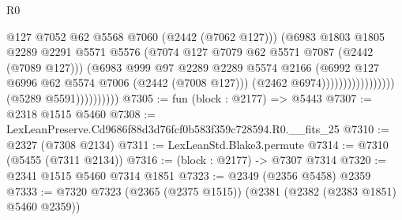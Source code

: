 \begin{lexlean}{R0}
\begin{coremodule}
                                                    @127
                                                    @7052
                                                    @62
                                                    @5568
                                                    @7060
                                                    (@2442 (@7062 @127)))
                                                  (@6983
                                                    @1803
                                                    @1805
                                                    @2289
                                                    @2291
                                                    @5571
                                                    @5576
                                                    (@7074
                                                      @127
                                                      @7079
                                                      @62
                                                      @5571
                                                      @7087
                                                      (@2442 (@7089 @127)))
                                                    (@6983
                                                      @999
                                                      @97
                                                      @2289
                                                      @2289
                                                      @5574
                                                      @2166
                                                      (@6992
                                                        @127
                                                        @6996
                                                        @62
                                                        @5574
                                                        @7006
                                                        (@2442 (@7008 @127)))
                                                      (@2462 @6974)))))))))))))))))
                      (@5289 @5591))))))))))
@7305 := fun (block : @2177) => @5443
@7307 := @2318 @1515 @5460
@7308 := LexLeanPreserve.Cd9686f88d3d76fcf0b583f359c728594.R0.__fits_25
@7310 := @2327 (@7308 @2134)
@7311 := LexLeanStd.Blake3.permute
@7314 := @7310 (@5455 (@7311 @2134))
@7316 := (block : @2177) -> @7307 @7314
@7320 := @2341 @1515 @5460 @7314 @1851
@7323 := @2349 (@2356 @5458) @2359
@7333 := @7320 @7323 (@2365 (@2375 @1515)) (@2381 (@2382 (@2383 @1851) @5460 @2359))

\end{coremodule}
\end{lexlean}
